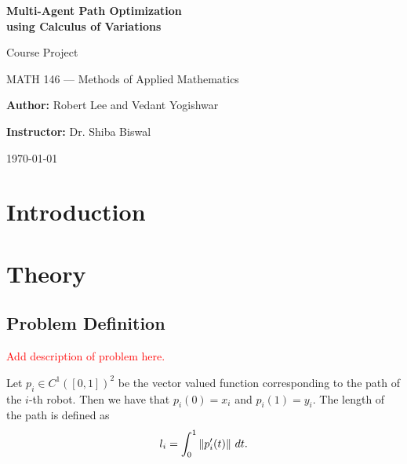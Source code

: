 \documentclass[11pt]{article}
\begin{document}
\begin{titlepage}

	\centering
	\null
	
	{\huge \textbf{Multi-Agent Path Optimization\\using Calculus of Variations}\par}
	\vspace{5mm}
	{\Large \large Course Project\par
	MATH 146 --- Methods of Applied Mathematics\par}
	\vspace{5mm}
	{\large \textbf{Author:} Robert Lee and Vedant Yogishwar\par
	\textbf{Instructor:} Dr. Shiba Biswal\par}
	
	
	{\large \today\par}

\end{titlepage}

\clearpage

\tableofcontents

\clearpage

\begin{abstract}
\lipsum[1-2]
\end{abstract}

\clearpage

\printunsrtglossary[type=symbols,style=long,title={List of Symbols}]

\section{Introduction}

\section{Theory}

\subsection{Problem Definition}

\textcolor{red}{Add description of problem here.}

Let \(p_i \in C^1([0,1])^2\) be the vector valued function corresponding to the path of the \(i\)-th robot. Then we have that \(p_i(0) = x_i\) and \(p_i(1) = y_i\). The length of the path is defined as
\begin{equation}
	l_i = \int_0^1 \left\lVert p_i'(t) \right\rVert \,dt.
\end{equation}
\end{document}
